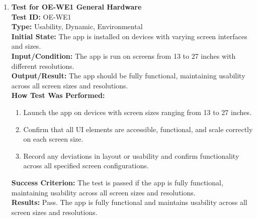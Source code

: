 \documentclass[12pt, titlepage]{article}
\begin{document}
\begin{enumerate}
    \item \textbf{Test for OE-WE1 General Hardware} \\
      \newline
      \textbf{Test ID:} OE-WE1 \\
      \textbf{Type:} Usability, Dynamic, Environmental \\
      \textbf{Initial State:} The app is installed on devices with varying screen interfaces and sizes. \\
      \textbf{Input/Condition:} The app is run on screens from 13 to 27 inches with different resolutions. \\
      \textbf{Output/Result:} The app should be fully functional, maintaining usability across all screen sizes and resolutions. \\
      \textbf{How Test Was Performed:}
      \begin{enumerate}
          \item Launch the app on devices with screen sizes ranging from 13 to 27 inches.
          \item Confirm that all UI elements are accessible, functional, and scale correctly on each screen size.
          \item Record any deviations in layout or usability and confirm functionality across all specified screen configurations.
      \end{enumerate}
      \textbf{Success Criterion:} The test is passed if the app is fully functional, maintaining usability across all screen sizes and resolutions.\\
      \textbf{Results:} Pass. The app is fully functional and maintains usability across all screen sizes and resolutions.\\


\end{enumerate}
\end{document}
